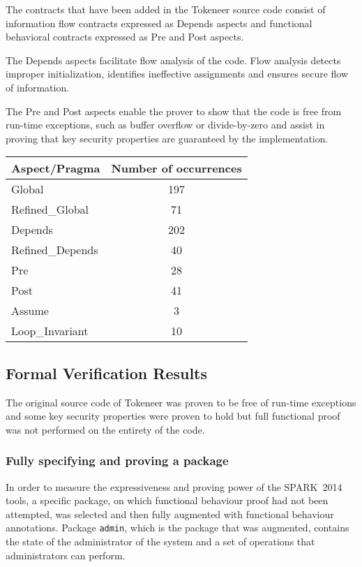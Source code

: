 \documentclass[10pt,a4paper,twocolumn]{article}
\newcommand{\newspark}{SPARK~2014\xspace}
\newcommand{\SPARK}[1]{\lstinline[language=Ada,basicstyle={\footnotesize
      \sffamily},framesep=0pt]$#1$}
\begin{document}
The contracts that have been added in the Tokeneer source code consist
of information flow contracts expressed as Depends aspects and
functional behavioral contracts expressed as Pre and Post aspects.

The Depends aspects facilitate flow analysis of the code. Flow
analysis detects improper initialization, identifies ineffective
assignments and ensures secure flow of information.

The Pre and Post aspects enable the prover to show that the code is
free from run-time exceptions, such as buffer overflow or
divide-by-zero and assist in proving that key security properties are
guaranteed by the implementation.

\begin{tabular}{|l|c|}
\hline
Aspect/Pragma       & Number of occurrences  \\
\hline
\hline
Global              & 197 \\
\hline
Refined\_Global     & 71 \\
\hline
Depends             & 202 \\
\hline
Refined\_Depends    & 40 \\
\hline
Pre                 & 28 \\
\hline
Post                & 41 \\
\hline
Assume              & 3 \\
\hline
Loop\_Invariant     & 10 \\
\hline
\end{tabular}

\subsection{Formal Verification Results}

The original source code of Tokeneer was proven to be free of run-time
exceptions and some key security properties were proven to hold but
full functional proof was not performed on the entirety of the code.

\subsubsection{Fully specifying and proving a package}

In order to measure the expressiveness and proving power of the
\newspark tools, a specific package, on which functional behaviour
proof had not been attempted, was selected and then fully augmented
with functional behaviour annotations. Package \SPARK{admin}, which is
the package that was augmented, contains the state of the
administrator of the system and a set of operations that
administrators can perform.
\end{document}
